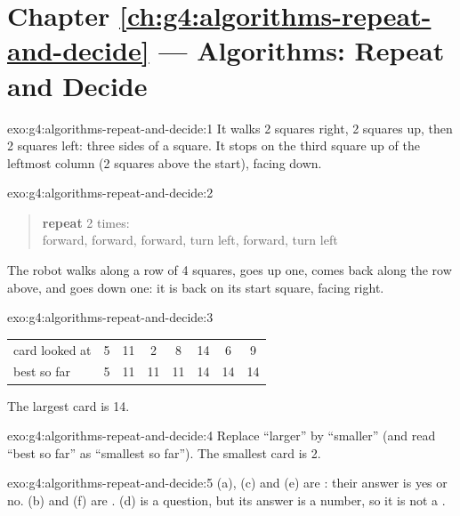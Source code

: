 \section*{Chapter \ref{ch:g4:algorithms-repeat-and-decide} --- Algorithms: Repeat and Decide}

\begin{solution}{exo:g4:algorithms-repeat-and-decide:1}
It walks 2 squares right, 2 squares up, then 2 squares left: three sides of a
square. It stops on the third square up of the leftmost column (2 squares
above the start), facing down.
\end{solution}

\begin{solution}{exo:g4:algorithms-repeat-and-decide:2}
\begin{quote}
\textbf{repeat} 2 times:\\
\hspace*{1.5em}forward, forward, forward, turn left, forward, turn left
\end{quote}
The robot walks along a row of 4 squares, goes up one, comes back along the
row above, and goes down one: it is back on its start square, facing right.
\end{solution}

\begin{solution}{exo:g4:algorithms-repeat-and-decide:3}
\begin{center}
\begin{tabular}{l*{7}{c}}
card looked at & 5 & 11 & 2 & 8 & 14 & 6 & 9 \\
best so far & 5 & 11 & 11 & 11 & 14 & 14 & 14
\end{tabular}
\end{center}
The largest card is 14.
\end{solution}

\begin{solution}{exo:g4:algorithms-repeat-and-decide:4}
Replace ``larger'' by ``smaller'' (and read ``best so far'' as ``smallest so
far''). The smallest card is 2.
\end{solution}

\begin{solution}{exo:g4:algorithms-repeat-and-decide:5}
(a), (c) and (e) are : their answer is yes or no. (b) and (f) are
. (d) is a question, but its answer is a number, so it is not a
.
\end{solution}


